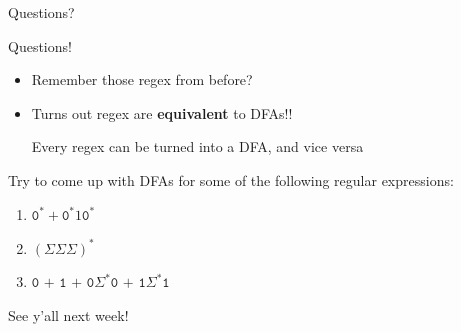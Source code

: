 \documentclass[aspectratio=169, handout]{beamer}
\begin{document}
\begin{frame}{}
      \begin{center}
    {\color{sigma@mainblue} \LARGE Questions?}
  \end{center}
\end{frame}

\begin{frame}{Questions!}
    
    \begin{itemize}
        \item Remember those regex from before? \pause
        \item Turns out regex are \textbf{equivalent} to DFAs!! 
        
              Every regex can be turned into a DFA, and vice versa \pause
    \end{itemize}
    
    Try to come up with DFAs for some of the following regular expressions:

    \begin{enumerate}
        \item $\texttt{0}^* + \texttt{0}^* 1 \texttt{0}^*$ 
        \item $( \Sigma \Sigma \Sigma)^*$
        \item $\texttt{0 + 1 + 0} \Sigma^* \texttt{0 + 1} \Sigma^* \texttt{1}$
    \end{enumerate}
\end{frame}

\begin{frame}
  \begin{center}
    {\color{sigma@mainblue} \LARGE See y'all next week!}
  \end{center}
\end{frame}

\end{document}
